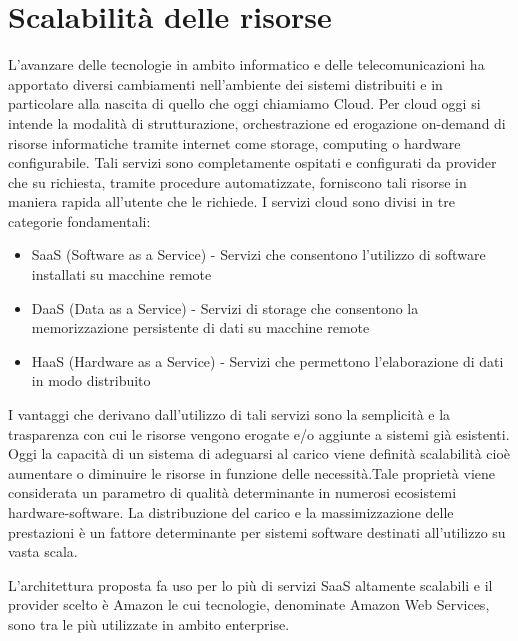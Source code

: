 \section*{Scalabilità delle risorse}
L'avanzare delle tecnologie in ambito informatico e delle telecomunicazioni ha apportato diversi cambiamenti nell'ambiente dei sistemi distribuiti e in particolare alla nascita di quello che oggi chiamiamo Cloud.
Per cloud oggi si intende la modalità di strutturazione, orchestrazione ed erogazione on-demand di risorse informatiche tramite internet come storage, computing o hardware configurabile. Tali servizi sono completamente ospitati e configurati da provider che su richiesta, tramite procedure automatizzate, forniscono tali risorse in maniera rapida all'utente che le richiede.
I servizi cloud sono divisi in tre categorie fondamentali:
\begin{itemize}
\item SaaS (Software as a Service) - Servizi che consentono l'utilizzo di software installati su macchine remote
\item DaaS (Data as a Service) - Servizi di storage che consentono la memorizzazione persistente di dati su macchine remote
\item HaaS (Hardware as a Service) - Servizi che permettono l'elaborazione di dati in modo distribuito
\end{itemize}
I vantaggi che derivano dall'utilizzo di tali servizi sono la semplicità e la trasparenza con cui le risorse vengono erogate e/o aggiunte a sistemi già esistenti. Oggi la capacità di un sistema di adeguarsi al carico viene definità scalabilità cioè aumentare o diminuire le risorse in funzione delle necessità.Tale proprietà viene considerata un parametro di qualità determinante in numerosi ecosistemi hardware-software. La distribuzione del carico e la massimizzazione delle prestazioni è un fattore determinante per sistemi software destinati all'utilizzo su vasta scala.

L'architettura proposta fa uso per lo più di servizi SaaS altamente scalabili e il provider scelto è Amazon le cui tecnologie, denominate Amazon Web Services, sono tra le più utilizzate in ambito enterprise.


